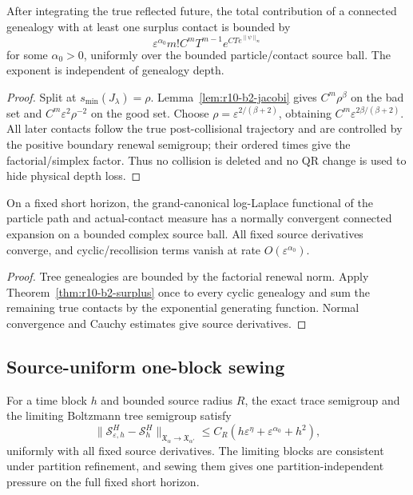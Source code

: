 \begin{theorem}
\label{thm:r10-b2-surplus}
After integrating the true reflected future, the total contribution of a
connected genealogy with at least one surplus contact is bounded by
\[
 \varepsilon^{\alpha_0}m!C^mT^{m-1}
 e^{CTe^{\|\psi\|_\infty}}
\]
for some \(\alpha_0>0\), uniformly over the bounded particle/contact source
ball.  The exponent is independent of genealogy depth.
\end{theorem}

\begin{proof}
Split at \(s_{\min}(J_\lambda)=\rho\).  Lemma~\ref{lem:r10-b2-jacobi} gives
\(C^m\rho^\beta\) on the bad set and
\(C^m\varepsilon^2\rho^{-2}\) on the good set.  Choose
\(\rho=\varepsilon^{2/(\beta+2)}\), obtaining
\(C^m\varepsilon^{2\beta/(\beta+2)}\).  All later contacts follow the true
post-collisional trajectory and are controlled by the positive boundary
renewal semigroup; their ordered times give the factorial/simplex factor.
Thus no collision is deleted and no QR change is used to hide physical depth
loss.
\end{proof}

\begin{corollary}
\label{cor:r10-b2-cluster}
On a fixed short horizon, the grand-canonical log-Laplace functional of the
particle path and actual-contact measure has a normally convergent connected
expansion on a bounded complex source ball.  All fixed source derivatives
converge, and cyclic/recollision terms vanish at rate
\(O(\varepsilon^{\alpha_0})\).
\end{corollary}

\begin{proof}
Tree genealogies are bounded by the factorial renewal norm.  Apply
Theorem~\ref{thm:r10-b2-surplus} once to every cyclic genealogy and sum the
remaining true contacts by the exponential generating function.  Normal
convergence and Cauchy estimates give source derivatives.
\end{proof}

\subsection{Source-uniform one-block sewing}

\begin{theorem}
\label{thm:r10-b2-block}
For a time block \(h\) and bounded source radius \(R\), the exact trace
semigroup and the limiting Boltzmann tree semigroup satisfy
\[
 \|\mathcal S_{\varepsilon,h}^H-
   \mathcal S_h^H\|_{\mathfrak X_\alpha\to\mathfrak X_{\alpha'}}
 \le C_R(h\varepsilon^\eta+
          \varepsilon^{\alpha_0}+h^2),
\]
uniformly with all fixed source derivatives.  The limiting blocks are
consistent under partition refinement, and sewing them gives one
partition-independent pressure on the full fixed short horizon.
\end{theorem}

